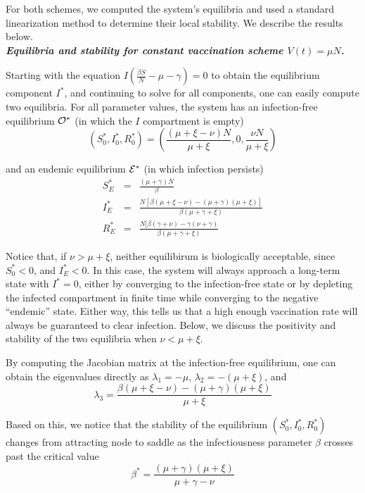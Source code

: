 \documentclass[10pt]{article}
\begin{document}
For both schemes, we computed the system's equilibria and used a standard linearization method to determine their local stability. We describe the results below.\\

\noindent \textbf{\emph{Equilibria and stability for constant vaccination scheme $V(t) = \mu N$.}} 

\noindent Starting with the equation
$I(\frac{\beta S}{N} - \mu - \gamma)=0$ to obtain the equilibrium component $I^*$, and continuing to solve for all components, one can easily compute two equilibria. For all parameter values, the system has an infection-free equilibrium ${\cal O}^*$ (in which the $I$ compartment is empty)
\begin{equation}
(S_0^*,I_0^*,R_0^*) = \left( \frac{(\mu+\xi-\nu)N}{\mu + \xi}, 0, \frac{\nu N}{\mu + \xi} \right)
\end{equation}

\noindent and an endemic equilibrium ${\cal E}^*$ (in which infection persists)
\begin{eqnarray}
S_E^* &=& \frac{(\mu + \gamma)N}{\beta}\\
I_E^* &=& \frac{N[\beta(\mu+\xi-\nu)-(\mu+\gamma)(\mu+ \xi)]}{\beta(\mu + \gamma +\xi)}\\
R_E^* &=& \frac{N[\beta(\gamma + \nu)-\gamma(\nu + \gamma)}{\beta(\mu + \gamma +\xi)}
\end{eqnarray}

Notice that, if $\nu > \mu + \xi$, neither equilibirum is biologically acceptable, since $S_0^*<0$, and $I_E^*<0$. In this case, the system will always approach a long-term state with $I^*=0$, either by converging to the infection-free state or by depleting the infected compartment in finite time while converging to the negative ``endemic'' state. Either way, this tells us that a high enough vaccination rate will always be guaranteed to clear infection. Below, we discuss the positivity and stability of the two equilibria when $\nu < \mu +\xi$.

By computing the Jacobian matrix at the infection-free equilibrium, one can obtain the eigenvalues directly as $\lambda_1 = -\mu$, $\lambda_2 = -(\mu+\xi)$, and 
$$\lambda_3 = \frac{\beta(\mu+\xi-\nu)-(\mu+\gamma)(\mu+\xi)}{\mu+\xi}$$

\noindent Based on this, we notice that the stability of the equilibrium $(S_0^*,I_0^*,R_0^*)$ changes from attracting node to saddle as the infectiousness parameter $\beta$ crosses past the critical value
\begin{equation}
\beta^* = \frac{(\mu+\gamma)(\mu+\xi)}{\mu+\gamma-\nu}
\label{transcritical_beta1}
\end{equation}
\end{document}
